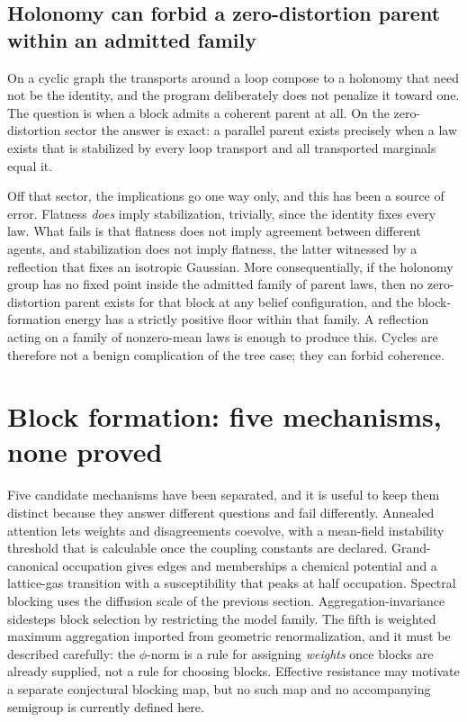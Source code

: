 \documentclass[11pt,letterpaper]{article}
\begin{document}
\subsection{Holonomy can forbid a zero-distortion parent within an admitted family}

On a cyclic graph the transports around a loop compose to a holonomy that need not be
the identity, and the program deliberately does not penalize it toward one. The
question is when a block admits a coherent parent at all. On the zero-distortion
sector the answer is exact: a parallel parent exists precisely when a law exists that
is stabilized by every loop transport and all transported marginals equal it.

Off that sector, the implications go one way only, and this has been a source of
error. Flatness \emph{does} imply stabilization, trivially, since the identity fixes
every law. What fails is that flatness does not imply agreement between different
agents, and stabilization does not imply flatness, the latter witnessed by a
reflection that fixes an isotropic Gaussian. More consequentially, if the holonomy
group has no fixed point inside the admitted family of parent laws, then no
zero-distortion parent exists for that block at any belief configuration, and the
block-formation energy has a strictly positive floor within that family. A
reflection acting on a family of nonzero-mean laws is enough to produce this. Cycles
are therefore not a benign complication of the tree case; they can forbid coherence.

\section{Block formation: five mechanisms, none proved}

Five candidate mechanisms have been separated, and it is useful to keep them
distinct because they answer different questions and fail differently. Annealed
attention lets weights and disagreements coevolve, with a mean-field instability
threshold that is calculable once the coupling constants are declared. Grand-canonical
occupation gives edges and memberships a chemical potential and a lattice-gas
transition with a susceptibility that peaks at half occupation. Spectral blocking uses
the diffusion scale of the previous section. Aggregation-invariance sidesteps block
selection by restricting the model family. The fifth is weighted maximum aggregation
imported from geometric renormalization, and it must be described carefully: the
$\phi$-norm is a rule for assigning \emph{weights} once blocks are already supplied,
not a rule for choosing blocks. Effective resistance may motivate a separate
conjectural blocking map, but no such map and no accompanying semigroup is currently
defined here.
\end{document}
